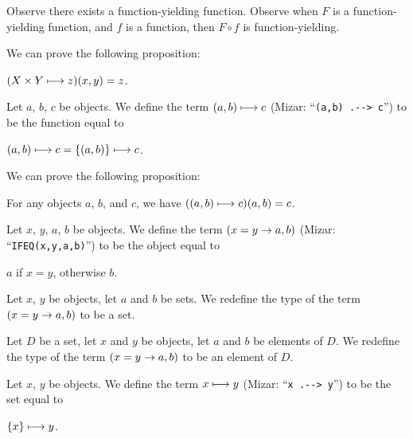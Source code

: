 \documentclass{article}
\begin{document}
Observe there exists a function-yielding function.
Observe when $F$ is a function-yielding function, and $f$ is a function,
then $F\circ f$ is function-yielding.

We can prove the following proposition:
\begin{thm}
\item\label{funcop1:70} $(X\times Y\longmapsto z)(x,y)=z$.
\end{thm}

\begin{definition}%
Let $a$, $b$, $c$ be objects.
We define the term $(a,b)\longmapsto c$ (Mizar: ``\verb#(a,b) .--> c#'') to be the function equal to
\begin{defn}
\item $(a,b)\longmapsto c = \{(a,b)\}\longmapsto c$.
\end{defn}
\end{definition}

We can prove the following proposition:
\begin{thm}
\item\label{funcop1:71} For any objects $a$, $b$, and $c$, we have
  $((a,b)\longmapsto c)(a,b)=c$.
\end{thm}

\begin{definition}%
Let $x$, $y$, $a$, $b$ be objects.
We define the term $(x=y \to a,b)$ (Mizar: ``\verb#IFEQ(x,y,a,b)#'')
to be the object equal to
\begin{defn}
\item $a$ if $x=y$, otherwise $b$.
\end{defn}
\end{definition}

\begin{definition}
Let $x$, $y$ be objects, let $a$ and $b$ be sets.
We redefine the type of the term $(x=y \to a,b)$ to be a set.
\end{definition}

\begin{definition}
Let $D$ be a set, let $x$ and $y$ be objects, let $a$ and $b$ be
elements of $D$.
We redefine the type of the term $(x=y \to a,b)$ to be an element of
$D$.
\end{definition}

\begin{definition}%
Let $x$, $y$ be objects.
We define the term $x\longmapsto y$ (Mizar: ``\verb#x .--> y#'')
to be the set equal to
\begin{defn}
\item $\{x\}\longmapsto y$.
\end{defn}
\end{definition}
\end{document}
